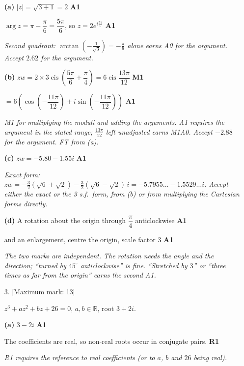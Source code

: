 \documentclass[12pt, twoside]{article}
\begin{document}
\begin{enumerate}[itemsep=0.3cm]
\textbf{(a)} $|z| = \sqrt{3 + 1} = 2$ \hfill \textbf{A1}

$\arg z = \pi - \dfrac{\pi}{6} = \dfrac{5\pi}{6}$, so
$z = 2e^{i\frac{5\pi}{6}}$ \hfill \textbf{A1}

\emph{Second quadrant: $\arctan\left(-\frac{1}{\sqrt{3}}\right) =
-\frac{\pi}{6}$ alone earns A0 for the argument. Accept $2.62$ for the
argument.}

\textbf{(b)} $zw = 2 \times 3 \operatorname{cis}\left(\dfrac{5\pi}{6} +
\dfrac{\pi}{4}\right) = 6\operatorname{cis}\dfrac{13\pi}{12}$
\hfill \textbf{M1}

$= 6\left(\cos\left(-\dfrac{11\pi}{12}\right) +
i\sin\left(-\dfrac{11\pi}{12}\right)\right)$ \hfill \textbf{A1}

\emph{M1 for multiplying the moduli and adding the arguments. A1 requires
the argument in the stated range; $\frac{13\pi}{12}$ left unadjusted earns
M1A0. Accept $-2.88$ for the argument. FT from (a).}

\textbf{(c)} $zw = -5.80 - 1.55i$ \hfill \textbf{A1}

\emph{Exact form: $zw = -\frac{3}{2}(\sqrt{6} + \sqrt{2}) -
\frac{3}{2}(\sqrt{6} - \sqrt{2})\,i = -5.7955\ldots - 1.5529\ldots i$.
Accept either the exact or the 3 s.f.\ form, from (b) or from multiplying
the Cartesian forms directly.}

\textbf{(d)} A rotation about the origin through $\dfrac{\pi}{4}$
anticlockwise \hfill \textbf{A1}

and an enlargement, centre the origin, scale factor $3$ \hfill \textbf{A1}

\emph{The two marks are independent. The rotation needs the angle and the
direction; ``turned by $45^{\circ}$ anticlockwise'' is fine. ``Stretched by
$3$'' or ``three times as far from the origin'' earns the second A1.}

\newpage

\item[3.] [Maximum mark: 13]

$z^{3} + az^{2} + bz + 26 = 0$, \quad $a, b \in \mathbb{R}$, root
$3 + 2i$.

\textbf{(a)} $3 - 2i$ \hfill \textbf{A1}

The coefficients are real, so non-real roots occur in conjugate pairs.
\hfill \textbf{R1}

\emph{R1 requires the reference to real coefficients (or to $a$, $b$ and
$26$ being real).}


\end{enumerate}
\end{document}
